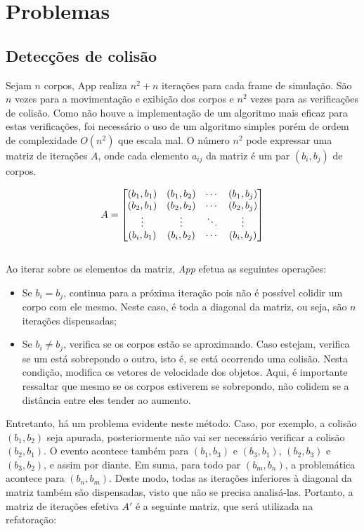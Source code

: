 \documentclass[11pt]{article}
\begin{document}
\section{Problemas}

\subsection{Detecções de colisão}

Sejam $n$ corpos, App realiza $n^2 + n$ iterações para cada frame de simulação. São $n$ vezes para a movimentação e exibição dos corpos e $n^2$ vezes para as verificações de colisão. Como não houve a implementação de um algoritmo mais eficaz para estas verificações, foi necessário o uso de um algoritmo simples porém de ordem de complexidade $O(n^2)$ que escala mal. O número $n^2$ pode expressar uma matriz de iterações $A$, onde cada elemento $a_{ij}$ da matriz é um par $(b_i, b_j)$ de corpos.

$$A= 
\begin{bmatrix} (b_1, b_1) & (b_1, b_2) & \cdots & (b_1, b_j) \cr
(b_2, b_1) & (b_2, b_2) & \cdots & (b_2, b_j) \cr 
\vdots & \vdots & \ddots & \vdots \cr
(b_i, b_1) & (b_i, b_2) & \cdots & (b_i, b_j) \cr 
\end{bmatrix} $$ \\

Ao iterar sobre os elementos da matriz, \textit{App} efetua as seguintes operações:

\begin{itemize}
    \item Se $b_i = b_j$, continua para a próxima iteração pois não é possível colidir um corpo com ele mesmo. Neste caso, é toda a diagonal da matriz, ou seja, são $n$ iterações dispensadas;
    \item Se $b_i \neq b_j$, verifica se os corpos estão se aproximando. Caso estejam, verifica se um está sobrepondo o outro, isto é, se está ocorrendo uma colisão. Nesta condição, modifica os vetores de velocidade dos objetos. Aqui, é importante ressaltar que mesmo se os corpos estiverem se sobrepondo, não colidem se a distância entre eles tender ao aumento.
\end{itemize}

Entretanto, há um problema evidente neste método. Caso, por exemplo, a colisão $(b_1, b_2)$ seja apurada, posteriormente não vai ser necessário verificar a colisão $(b_2, b_1)$. O evento acontece também para $(b_1, b_3)$ e $(b_3, b_1)$, $(b_2, b_3)$ e $(b_3, b_2)$, e assim por diante. Em suma, para todo par $(b_m, b_n)$, a problemática acontece para $(b_n, b_m)$. Deste modo, todas as iterações inferiores à diagonal da matriz também são dispensadas, visto que não se precisa analisá-las. Portanto, a matriz de iterações efetiva $A'$ é a seguinte matriz, que será utilizada na refatoração:
\end{document}
